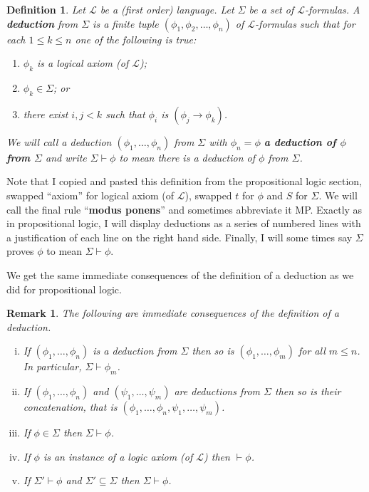 \documentclass[11pt]{article}
\newcommand{\proves}{\vdash}
\newtheorem{remark}[theorem]{Remark}
\newtheorem{definition}[theorem]{Definition}
\newcommand{\mcal}[1]{\mathcal{#1}}
\begin{document}
\begin{definition}
Let $\mcal{L}$  be a (first order) language. Let $\Sigma$ be a set of $\mcal{L}$-formulas. A \textbf{deduction} from $\Sigma$ is a finite tuple $(\phi_1,\phi_2,\ldots,\phi_n)$ of $\mcal{L}$-formulas such that for each $1\leq k\leq n$ one of the following is true:
\begin{enumerate}
\item $\phi_k$ is a logical axiom (of $\mcal{L}$);
\item $\phi_k\in \Sigma$; or
\item there exist $i,j<k$ such that $\phi_i$ is $(\phi_j\rightarrow \phi_k)$.
\end{enumerate}

We will call a deduction $(\phi_1,\ldots,\phi_n)$ from $\Sigma$ with $\phi_n=\phi$ \textbf{a deduction of $\phi$ from $\Sigma$} and write
 $\Sigma\vdash \phi$ to mean there is a deduction of $\phi$ from $\Sigma$.
\end{definition}

Note that I copied and pasted this definition from the propositional logic section, swapped ``axiom'' for logical axiom (of $\mcal{L}$), swapped $t$ for $\phi$ and $S$ for $\Sigma$.
We will call the final rule ``\textbf{modus ponens}'' and sometimes abbreviate it MP. Exactly as in propositional logic, I will display deductions as a series of numbered lines with a justification of each line on the right hand side. Finally, I will some times say $\Sigma$ proves $\phi$ to mean $\Sigma\proves \phi$.

We get the same immediate consequences of the definition of a deduction as we did for propositional logic.

\begin{remark}\label{deductionrempred}
The following are immediate consequences of the definition of a deduction.
\begin{enumerate}[(i)]
\item If $(\phi_1,\ldots,\phi_n)$ is a deduction from $\Sigma$ then so is $(\phi_1,\ldots, \phi_m)$ for all $m\leq n$. In particular, $\Sigma\vdash \phi_m$.
\item If $(\phi_1,\ldots, \phi_n)$ and $(\psi_1,\dots, \psi_m)$ are deductions from $\Sigma$ then so is their concatenation, that is $(\phi_1,\ldots,\phi_n,\psi_1,\ldots,\psi_m)$.
\item If $\phi\in \Sigma$ then $\Sigma\vdash \phi$.
\item If $\phi$ is an instance of a logic axiom (of $\mcal{L}$) then $\proves \phi$.
\item If $\Sigma'\proves \phi$ and $\Sigma'\subseteq \Sigma$ then $\Sigma\proves \phi$.
\end{enumerate}
\end{remark}
\end{document}
